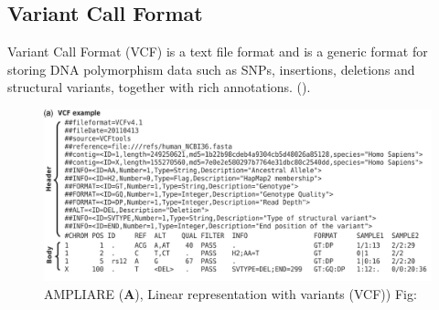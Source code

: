 \subsection{Variant Call Format}
Variant Call Format (VCF) is a text file format and is a generic format for storing DNA polymorphism data such as SNPs, insertions, deletions and structural variants, together with rich annotations. (\cite{10.1093/bioinformatics/btr330}). 


\begin{figure}[H]
\centering
\includegraphics[width=1.00\textwidth]{fig/vcf.png}
\decoRule
\caption{AMPLIARE (\textbf{A}), Linear representation with variants (VCF)) Fig:\cite{10.1093/bioinformatics/btr330}}
\label{fig:vcf.png}
\end{figure}



